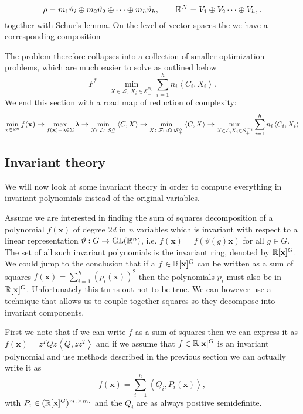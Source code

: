 \documentclass[]{article}
\begin{document}
\[\rho = m_1\vartheta_i\oplus m_2\vartheta_2 \oplus \cdots \oplus m_h\vartheta_h, \quad \quad \mathbb R^N = V_1\oplus V_2 \cdots \oplus V_h,.\]
together with Schur's lemma. 
On the level of vector spaces the we have a corresponding composition


The problem therefore collapses into a collection of smaller 
optimization problems, which are much easier to solve as outlined below 
\[F^\ast = \min_{X\in\mathcal{L},~X_i \in \mathcal{S}_+^{m_i} }\sum_{i=1}^{h} n_i\left<C_i,X_i\right>.\]
We end this section with a road map of reduction of complexity:
\[\min_{x\in\mathbb R^n}f(\mathbf{x}) \rightarrow \max_{f(\mathbf{x})-\lambda\in \Sigma} \lambda \rightarrow\min_{X\in\mathcal{L}\cap \mathcal{S}_+^N } \left<C,X\right> \rightarrow 
\min_{X\in\mathcal{F}\cap\mathcal{L}\cap \mathcal{S}_+^N } \left<C,X\right> \rightarrow
\min_{X\in\mathcal{L}, X_i \in \mathcal{S}_+^{m_i} }\sum_{i=1}^{h} n_i\left<C_i,X_i\right>\]
\subsection*{Invariant theory}
We will now look at some invariant theory in order to compute everything in invariant polynomials instead of the original variables.

Assume we are interested in finding the sum of squares decomposition of a polynomial $f(\textbf{x})$ of degree $2d$ in $n$
variables which is invariant with respect to a linear representation $\vartheta:G\rightarrow \mathrm{GL}(\mathbb R^n)$, i.e. $f(\textbf{x}) = f(\vartheta(g)\textbf{x})$ for all $g\in G$.
The set of all such invariant polynomials is the invariant ring, denoted by $\mathbb R[\textbf{x}]^G$. We could jump to the conclusion that if a $f\in \mathbb R[\textbf{x}]^G$ can be written as a 
sum of squares $f(\textbf{x}) =\sum_{i=1}^{h}(p_i(\textbf{x}))^2$ then the polynomials $p_i$ must also be in $\mathbb R[\mathbf{x}]^G$. Unfortunately this turns out not to be true. We can however
use a technique that allows us to couple together squares so they decompose into invariant components.

First we note that if we can write $f$ as a sum of squares then we can express it as $f(\textbf{x}) = z^TQz \left<Q,zz^T\right>$ and if we assume that $f\in \mathbb R[\mathbf{x}]^G$ is an invariant polynomial and use methods described in the previous section we can actually write it as 
\[f(\textbf{x}) = \sum_{i=1}^{h}\left<Q_i,P_i(\mathbf{x})\right>,\]
with $P_i\in (\mathbb R[\mathbf{x}]^G)^{m_i\times m_i}$
and the $Q_i$ are as always positive semidefinite.  
\end{document}

